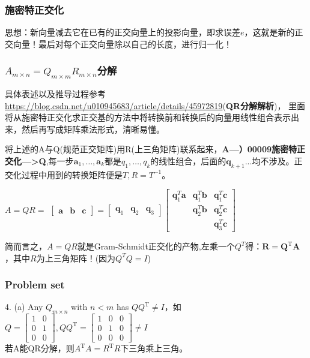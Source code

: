     \subsubsection{施密特正交化}
    思想：新向量减去它在已有的正交向量上的投影向量，即求误差$e$，这就是新的正交向量！最后对每个正交向量除以自己的长度，进行归一化！

    \subsubsection{$A_{m\times n}=Q_{m\times m}R_{m\times n}$分解}
    具体表述以及推导过程参考\url{https://blog.csdn.net/u010945683/article/details/45972819}(\textbf{QR分解解析})，
    里面将从施密特正交化求正交基的方法中将转换前和转换后的向量用线性组合表示出来，然后再写成矩阵乘法形式，清晰易懂。

    将上述的A与Q(规范正交矩阵)用R(上三角矩阵)联系起来，\textbf{A---）00009施密特正交化--->Q},每一步$\boldsymbol{a}_{1}, \dots, \boldsymbol{a}_{k}$都是$q_{1}, \ldots, q_{k}$的线性组合，后面的$\bm{q}_{k+1}...$均不涉及。正交化过程中用到的转换矩阵便是$T,R=T^{-1}$。

    $A=Q R=$
    $\left[\begin{array}{lll}{\bm{a}} & {\bm{b}} & {\bm{c}}\end{array}\right]=\left[\begin{array}{lll}{\bm{q}_{1}} & {\bm{q}_{2}} & {\bm{q}_{3}}\end{array}\right]\left[\begin{array}{ccc}{\bm{q}_{1}^{T} \bm{a}} & {\bm{q}_{1}^{T} \bm{b}} & {\bm{q}_{1}^{T} \bm{c}} \\ {} & {\bm{q}_{2}^{T} \bm{b}} & {\bm{q}_{2}^{T} \bm{c}} \\ {} & {} & {\bm{q}_{3}^{T} \bm{c}}\end{array}\right]$

    简而言之，$A=Q R$就是Gram-Schmidt正交化的产物,左乘一个$Q^T$得：$\boldsymbol{R}=\boldsymbol{Q}^{\mathrm{T}} \boldsymbol{A}$，其中$R$为上三角矩阵！(因为$Q^T Q = I$)

    \subsubsection{Problem set}
    4. (a) Any $Q_{m\times n}$ with $n<m$ has $Q Q^{\mathrm{T}} \neq I$，如$Q=\left[\begin{array}{ll}{1} & {0} \\ {0} & {1} \\ {0} & {0}\end{array}\right], Q Q^{\mathrm{T}}=\left[\begin{array}{ccc}{1} & {0} & {0} \\ {0} & {1} & {0} \\ {0} & {0} & {0}\end{array}\right] \neq I$
    \\
    若A能QR分解，则$A^{\mathrm{T}} A=R^{\mathrm{T}} R$下三角乘上三角。